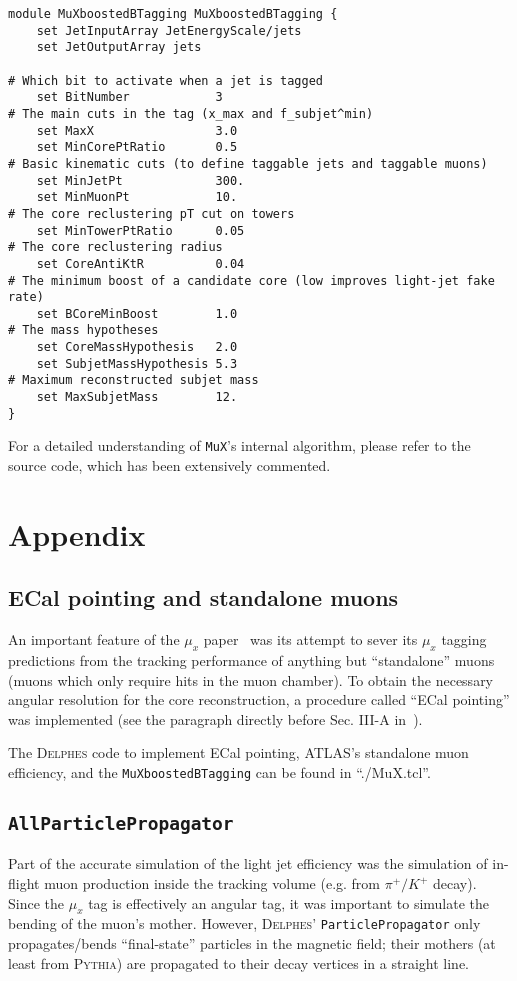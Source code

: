 \documentclass[10pt]{article}
\newcommand{\muX}{$\mu_{x}^{}$}
\newcommand{\muXmodFull}{\texttt{MuXboostedBTagging}}
\newcommand{\muXmod}{\texttt{MuX}}
\newcommand{\delphes}{\textsc{Delphes}}
\begin{document}
\begin{lstlisting}
module MuXboostedBTagging MuXboostedBTagging {
    set JetInputArray JetEnergyScale/jets
    set JetOutputArray jets

# Which bit to activate when a jet is tagged
    set BitNumber            3
# The main cuts in the tag (x_max and f_subjet^min)
    set MaxX                 3.0
    set MinCorePtRatio       0.5
# Basic kinematic cuts (to define taggable jets and taggable muons)
    set MinJetPt             300.
    set MinMuonPt            10.
# The core reclustering pT cut on towers
    set MinTowerPtRatio      0.05
# The core reclustering radius
    set CoreAntiKtR          0.04
# The minimum boost of a candidate core (low improves light-jet fake rate)
    set BCoreMinBoost        1.0
# The mass hypotheses
    set CoreMassHypothesis   2.0
    set SubjetMassHypothesis 5.3
# Maximum reconstructed subjet mass
    set MaxSubjetMass        12.
}
\end{lstlisting}

For a detailed understanding of {\muXmod}'s internal algorithm, please refer
to the source code, which has been extensively commented.

\section{Appendix}
\subsection{ECal pointing and standalone muons}

An important feature of the {\muX} paper~\cite{Pedersen:MuX} was its attempt to
sever its {\muX} tagging predictions from the tracking performance of
anything but ``standalone'' muons (muons which only require hits in the muon
chamber). To obtain the necessary angular resolution for the core
reconstruction, a procedure called ``ECal pointing'' was implemented (see the
paragraph directly before Sec. III-A in~\cite{Pedersen:MuX}).

The {\delphes} code to implement ECal pointing, ATLAS's standalone muon
efficiency, and the {\muXmodFull} can be found in ``./MuX.tcl''.

\subsection{\texttt{AllParticlePropagator}}

Part of the accurate simulation of the light jet efficiency was the simulation
of in-flight muon production inside the tracking volume (e.g. from
$\pi^{+}/K^{+}$ decay). Since the {\muX} tag is effectively an angular tag, it
was important to simulate the bending of the muon's mother. However, {\delphes}'
\texttt{ParticlePropagator} only propagates/bends ``final-state'' particles in
the magnetic field; their mothers (at least from \textsc{Pythia}) are propagated
to their decay vertices in a straight line.
\end{document}
